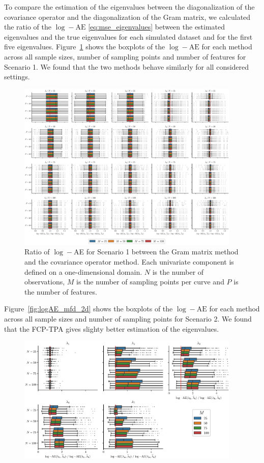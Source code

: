 \begin{results}
To compare the estimation of the eigenvalues between the diagonalization of the covariance operator and the diagonalization of the Gram matrix, we calculated the ratio of the $\log-\text{AE}$ \eqref{eq:mse_eigenvalues} between the estimated eigenvalues and the true eigenvalues for each simulated dataset and for the first five eigenvalues.
Figure~\ref{fig:logAE_mfd_1d} shows the boxplots of the $\log-\text{AE}$ for each method across all sample sizes, number of sampling points and number of features for Scenario 1. We found that the two methods behave similarly for all considered settings.
\begin{figure}
    \centering
    \includegraphics[width=0.95\textwidth]{figures/scenario_1/logAE.eps}
    \caption{Ratio of $\log-$AE for Scenario 1 between the Gram matrix method and the covariance operator method. Each univariate component is defined on a one-dimensional domain. $N$ is the number of observations, $M$ is the number of sampling points per curve and $P$ is the number of features.}
    \label{fig:logAE_mfd_1d}
\end{figure}
Figure~\ref{fig:logAE_mfd_2d} shows the boxplots of the $\log-\text{AE}$ for each method across all sample sizes and number of sampling points for Scenario 2. We found that the FCP-TPA gives slighty better estimation of the eigenvalues.
\begin{figure}
     \centering
    \includegraphics[width=0.95\textwidth]{figures/scenario_2/logAE.eps}

\end{figure}
\end{results}
